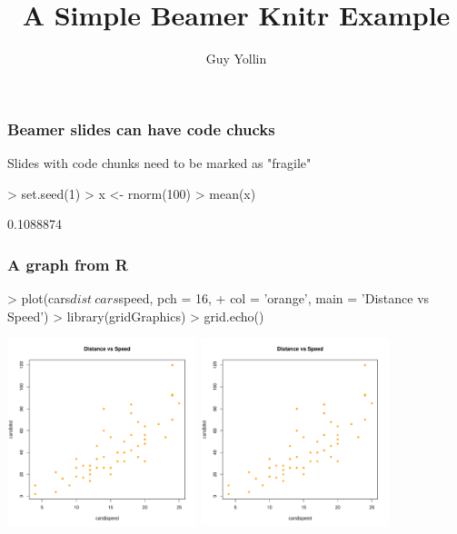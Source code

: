 \documentclass{beamer}
\title{A Simple Beamer Knitr Example}
\author{Guy Yollin}
\begin{document}


\maketitle

\begin{frame}[fragile]
\frametitle{Beamer slides can have code chucks}
Slides with code chunks need to be marked as "fragile"
\begin{Schunk}
\begin{Sinput}
> set.seed(1)
> x <- rnorm(100)
> mean(x)
\end{Sinput}
\begin{Soutput}
[1] 0.1088874
\end{Soutput}
\end{Schunk}
\end{frame}

\begin{frame}[fragile]
\frametitle{A graph from R}
\begin{Schunk}
\begin{Sinput}
> plot(cars$dist ~ cars$speed, pch = 16, 
+      col = 'orange', main = 'Distance vs Speed')
> library(gridGraphics)
> grid.echo()
\end{Sinput}
\end{Schunk}
\begin{center}
\includegraphics[height = 5.5cm, width = 5.5cm]{intro_1.pdf}
\includegraphics[height = 5.5cm, width = 5.5cm]{intro_2.pdf}
\end{center}

\end{frame}
\end{document}
